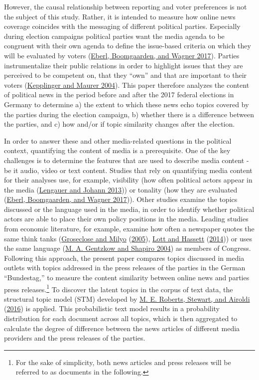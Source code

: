 \documentclass[
]{article}
\begin{document}
However, the causal relationship between reporting and voter preferences
is not the subject of this study. Rather, it is intended to measure how
online news coverage coincides with the messaging of different political
parties. Especially during election campaigns political parties want the
media agenda to be congruent with their own agenda to define the
issue-based criteria on which they will be evaluated by voters
(\protect\hyperlink{ref-eberl_one_2017}{Eberl, Boomgaarden, and Wagner
2017}). Parties instrumentalize their public relations in order to
highlight issues that they are perceived to be competent on, that they
``own'' and that are important to their voters
(\protect\hyperlink{ref-kepplinger_einfluss_2004}{Kepplinger and Maurer
2004}). This paper therefore analyzes the content of political news in
the period before and after the 2017 federal elections in Germany to
determine a) the extent to which these news echo topics covered by the
parties during the election campaign, b) whether there is a difference
between the parties, and c) how and/or if topic similarity changes after
the election.

In order to answer these and other media-related questions in the
political context, quantifying the content of media is a prerequisite.
One of the key challenges is to determine the features that are used to
describe media content - be it audio, video or text content. Studies
that rely on quantifying media content for their analyses use, for
example, visibility (how often political actors appear in the media
(\protect\hyperlink{ref-lengauer_candidate_2013}{Lengauer and Johann
2013})) or tonality (how they are evaluated
(\protect\hyperlink{ref-eberl_one_2017}{Eberl, Boomgaarden, and Wagner
2017})). Other studies examine the topics discussed or the language used
in the media, in order to identify whether political actors are able to
place their own policy positions in the media. Leading studies from
economic literature, for example, examine how often a newspaper quotes
the same think tanks
(\protect\hyperlink{ref-groseclose_measure_2005}{Groseclose and Milyo}
(\protect\hyperlink{ref-groseclose_measure_2005}{2005}),
\protect\hyperlink{ref-lott_is_2014}{Lott and Hassett}
(\protect\hyperlink{ref-lott_is_2014}{2014})) or uses the same language
(\protect\hyperlink{ref-gentzkow_media_2004}{M. A. Gentzkow and Shapiro
2004}) as members of Congress. Following this approach, the present
paper compares topics discussed in media outlets with topics addressed
in the press releases of the parties in the German ``Bundestag,'' to
measure the content similarity between online news and parties press
releases.\footnote{For the sake of simplicity, both news articles and
  press releases will be referred to as documents in the following.} To
discover the latent topics in the corpus of text data, the structural
topic model (STM) developed by
\protect\hyperlink{ref-roberts_model_2016}{M. E. Roberts, Stewart, and
Airoldi} (\protect\hyperlink{ref-roberts_model_2016}{2016}) is applied.
This probabilistic text model results in a probability distribution for
each document across all topics, which is then aggregated to calculate
the degree of difference between the news articles of different media
providers and the press releases of the parties.
\end{document}
